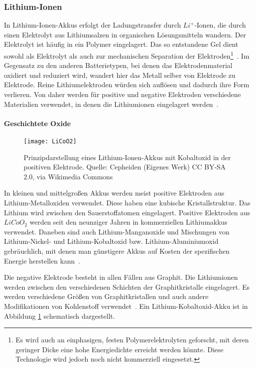 \subsubsection{Lithium-Ionen}
In Lithium-Ionen-Akkus erfolgt der Ladungstransfer durch $Li^+$-Ionen, die durch einen Elektrolyt aus Lithiumsalzen in organischen Lösungsmitteln wandern. Der Elektrolyt ist häufig in ein Polymer eingelagert. Das so entstandene Gel dient sowohl als Elektrolyt als auch zur mechanischen Separation der Elektroden\footnote{Es wird auch an einphasigen, festen Polymerelektrolyten geforscht, mit deren geringer Dicke eine hohe Energiedichte erreicht werden könnte. Diese Technologie wird jedoch noch nicht kommerziell eingesetzt.}~\cite{xu2004nonaqueous}. Im Gegensatz zu den anderen Batterietypen, bei denen das Elektrodenmaterial oxidiert und reduziert wird, wandert hier das Metall selber von Elektrode zu Elektrode. Reine Lithiumelektroden würden sich auflösen und dadurch ihre Form verlieren. Von daher werden für positive und negative Elektroden verschiedene Materialien verwendet, in denen die Lithiumionen eingelagert werden~\cite[S. 408, 440ff]{KiehneBattery}. 

\paragraph{Geschichtete Oxide}

\begin{figure}\centering
	\texttt{[image: LiCoO2]}
	\caption[Prinzipdarstellung eines Lithium-Ionen-Akkus]{Prinzipdarstellung eines Lithium-Ionen-Akkus mit Kobaltoxid in der positiven Elektrode. Quelle: Cepheiden (Eigenes Werk) CC BY-SA 2.0, via Wikimedia Commons}
	\label{abb_LiCoO2}
\end{figure}

In kleinen und mittelgroßen Akkus werden meist positive Elektroden aus Lithium-Metalloxiden verwendet. Diese haben eine kubische Kristallstruktur. Das Lithium wird zwischen den Sauerstoffatomen eingelagert. Positive Elektroden aus $LiCoO_2$ werden seit den neunziger Jahren in kommerziellen Lithiumakkus verwendet. Daneben sind auch Lithium-Manganoxide und Mischungen von Lithium-Nickel- und Lithium-Kobaltoxid bzw. Lithium-Aluminiumoxid gebräuchlich, mit denen man günstigere Akkus auf Kosten der spezifischen Energie herstellen kann~\cite{whittingham2004lithium}.

Die negative Elektrode besteht in allen Fällen aus Graphit. Die Lithiumionen werden zwischen den verschiedenen Schichten der Graphitkristalle eingelagert. Es werden verschiedene Größen von Graphitkristallen und auch andere Modifikationen von Kohlenstoff verwendet~\cite[S. 252]{Sterner:2014}. Ein Lithium-Kobaltoxid-Akku ist in Abbildung \ref{abb_LiCoO2} schematisch dargestellt.

